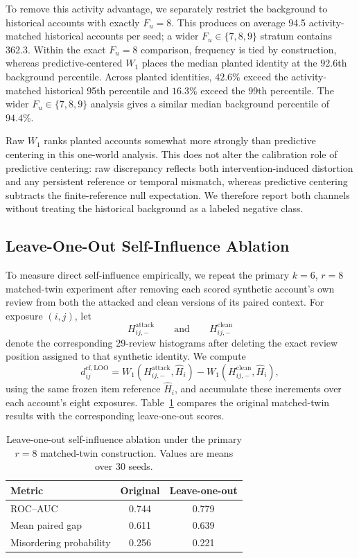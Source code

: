 To remove this activity advantage, we separately restrict the background to
historical accounts with exactly $F_u=8$.  This produces on average 94.5
activity-matched historical accounts per seed; a wider $F_u\in\{7,8,9\}$ stratum
contains 362.3. 
Within the exact $F_u=8$ comparison, frequency is tied by construction, whereas
predictive-centered $W_1$ places the median planted identity at the $92.6$th
background percentile.  Across planted identities, $42.6\%$ exceed the
activity-matched historical 95th percentile and $16.3\%$ exceed the 99th
percentile. 
The wider $F_u\in\{7,8,9\}$ analysis gives a similar median background percentile
of $94.4\%$.

Raw $W_1$ ranks planted accounts somewhat more strongly than predictive
centering in this one-world analysis. This does not alter the calibration role
of predictive centering: raw discrepancy reflects both intervention-induced
distortion and any persistent reference or temporal mismatch, whereas
predictive centering subtracts the finite-reference null expectation. We
therefore report both channels without treating the historical background as a
labeled negative class.



\subsection{Leave-One-Out Self-Influence Ablation}
\label{sec:supp-self-influence-ablation}

To measure direct self-influence empirically, we repeat the primary
$k=6$, $r=8$ matched-twin experiment after removing each scored synthetic
account's own review from both the attacked and clean versions of its paired
context. For exposure $(i,j)$, let
\[
H_{ij,-}^{\mathrm{attack}}
\qquad\text{and}\qquad
H_{ij,-}^{\mathrm{clean}}
\]
denote the corresponding 29-review histograms after deleting the exact review
position assigned to that synthetic identity. We compute
\[
d_{ij}^{\mathrm{cf,LOO}}
=
W_1(H_{ij,-}^{\mathrm{attack}},\widehat H_i)
-
W_1(H_{ij,-}^{\mathrm{clean}},\widehat H_i),
\]
using the same frozen item reference $\widehat H_i$, and accumulate these
increments over each account's eight exposures. Table~\ref{tab:supp-self-influence} compares the original matched-twin results
with the corresponding leave-one-out scores.

\begin{table}[t]
\caption{Leave-one-out self-influence ablation under the primary
$r=8$ matched-twin construction. Values are means over 30 seeds.}
\label{tab:supp-self-influence}
\centering
\small
\begin{tabular}{@{}lcc@{}}
\toprule
\textbf{Metric} & \textbf{Original} & \textbf{Leave-one-out} \\
\midrule
ROC--AUC & 0.744 & 0.779 \\
Mean paired gap & 0.611 & 0.639 \\
Misordering probability & 0.256 & 0.221 \\
\bottomrule
\end{tabular}
\end{table}

